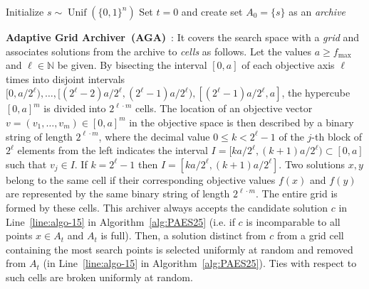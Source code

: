 \documentclass[
sigconf = false, %
review = false, %
screen = true, %
anonymous = true, %
format=acmsmall
]{acmart}
\DeclareMathOperator{\Unif}{Unif}                         %
\newcommand{\PAES}{PAES-25\xspace}
\begin{document}
\begin{algorithm2e}[t]
\caption{\PAES with archive size $L$ and archiver $X$ for maximizing $f:\{0,1\}^n \to \mathbb{N}_0^m$}\label{alg:PAES25}
Initialize $s \sim \Unif(\{0,1\}^n)$\;
Set $t=0$ and create set $A_0=\{s\}$ as an \emph{archive}\;
\DontPrintSemicolon
\end{algorithm2e}     

\textbf{Adaptive Grid Archiver~(AGA)}~\cite{Knowles2000}: It covers the search space with a \emph{grid} and associates solutions from the archive to \emph{cells} as follows. Let the values $a \geq f_{\max}$ and $\ell \in \mathbb{N}$ be given. By bisecting the interval $[0,a]$ of each objective axis $\ell$ times into disjoint intervals $[0,a/2^{\ell}), \ldots , [(2^{\ell}-2)a/2^{\ell},(2^{\ell}-1)a/2^{\ell}), [(2^{\ell}-1)a/2^{\ell},a]$, the hypercube $[0,a]^m$ is divided into $2^{\ell \cdot m}$ cells. The location of an objective vector $v=(v_1, \ldots , v_m) \in [0,a]^m$ in the objective space is then described by a binary string of length $2^{\ell \cdot m}$, where the decimal value $0 \leq k<2^\ell-1$ of the $j$-th block of $2^\ell$ elements from the left indicates the interval $I=[ka/2^\ell,(k+1)a/2^\ell) \subset [0,a]$ such that $v_j \in I$. If $k=2^\ell-1$ then $I=[ka/2^\ell,(k+1)a/2^\ell]$. Two solutions $x,y$ belong to the same cell if their corresponding objective values $f(x)$ and $f(y)$ are represented by the same binary string of length $2^{\ell \cdot m}$. The entire grid is formed by these cells. %
This archiver always accepts the candidate solution $c$ in Line~\ref{line:algo-15} in Algorithm~\ref{alg:PAES25} (i.e. if $c$ is incomparable to all points $x \in A_t$ and $A_t$ is full). Then, a solution distinct from $c$ from a grid cell containing the most search points is selected uniformly at random and removed from $A_t$ (in Line~\ref{line:algo-15} in Algorithm~\ref{alg:PAES25}). Ties with respect to such cells are broken uniformly at random.
\end{document}
